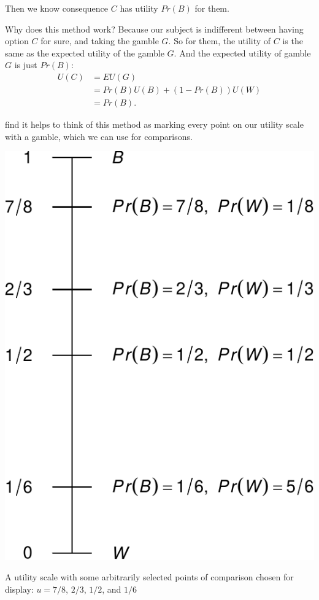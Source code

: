 \documentclass[justified]{tufte-book}
\renewcommand{\u}{U}
\newcommand{\p}{Pr}
\newcommand{\EU}{EU}
\theoremstyle{definition}
\theoremstyle{definition}
\theoremstyle{definition}
\theoremstyle{remark}
\begin{document}
Then we know consequence \(C\) has utility \(\p(B)\) for them.

Why does this method work? Because our subject is indifferent between
having option \(C\) for sure, and taking the gamble \(G\). So for them,
the utility of \(C\) is the same as the expected utility of the gamble
\(G\). And the expected utility of gamble \(G\) is just \(\p(B)\): \[
  \begin{aligned}
    \u(C) &= \EU(G)\\
          &= \p(B) \u(B) + (1-\p(B)) \u(W)\\
          &= \p(B).
  \end{aligned}
\]

 find it helps to think of this method as marking every
point on our utility scale with a gamble, which we can use for
comparisons.

\begin{marginfigure}
\includegraphics{_main_files/figure-latex/uscale-1} \caption[A utility scale with some arbitrarily selected points of comparison chosen for display]{A utility scale with some arbitrarily selected points of comparison chosen for display: $u = 7/8$, $2/3$, $1/2$, and $1/6$}\label{fig:uscale}
\end{marginfigure}
\end{document}
